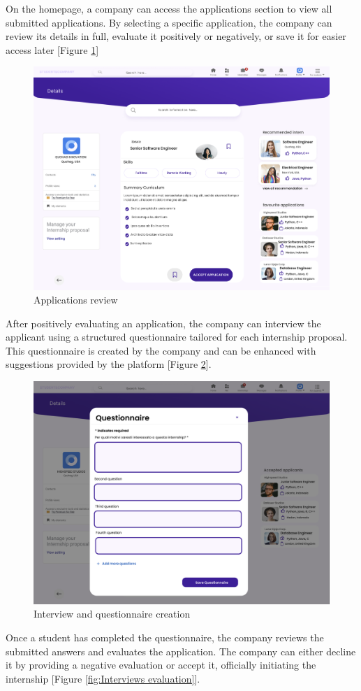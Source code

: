 On the homepage, a company can access the applications section to view all submitted applications. By selecting a specific application, the company can review its details in full, evaluate it positively or negatively, or save it for easier access later [Figure \ref{fig:Application review}] 

\begin{figure} [H]
    \centering
    \includegraphics[width=0.5\linewidth]{Images/Interface Images/company interface/Screenshot 2024-12-12 045731.png}
    \caption{Applications review}
    \label{fig:Application review}
\end{figure}


After positively evaluating an application, the company can interview the applicant using a structured questionnaire tailored for each internship proposal. This questionnaire is created by the company and can be enhanced with suggestions provided by the platform [Figure \ref{fig:Interview and questionnaire creation}].

\begin{figure} [H]
    \centering
    \includegraphics[width=0.5\linewidth]{Images/Interface Images/company interface/Screenshot 2024-12-12 045749.png}
    \caption{Interview and questionnaire creation}
    \label{fig:Interview and questionnaire creation}
\end{figure}

Once a student has completed the questionnaire, the company reviews the submitted answers and evaluates the application. The company can either decline it by providing a negative evaluation or accept it, officially initiating the internship [Figure \ref{fig:Interviews evaluation}].

